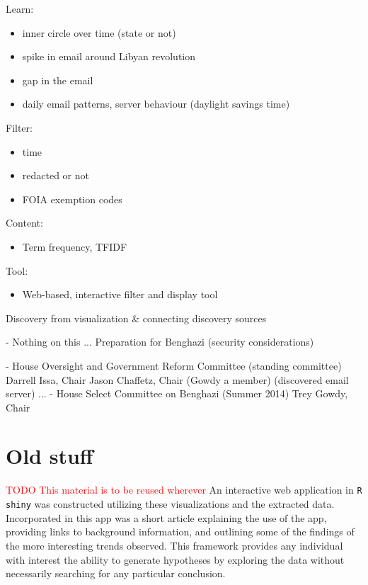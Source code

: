 \documentclass[journal]{vgtc}                %
\newcommand*{\TODO}[1]{\textcolor{red}{TODO #1}}
\begin{document}
Learn:
\begin{itemize}
\item inner circle over time (state or not)
\item spike in email around Libyan revolution
\item gap in the email
\item daily email patterns, server behaviour (daylight savings time)
\end{itemize}

  
 Filter:
\begin{itemize}
\item time
\item redacted or not
\item FOIA exemption codes
\end{itemize}

   
 Content:
\begin{itemize}
\item Term frequency, TFIDF
\end{itemize}

   
 Tool: 
\begin{itemize}
\item Web-based, interactive filter and display tool
\end{itemize}
    
    
Discovery from visualization \& connecting discovery sources



- Nothing on this ... Preparation for Benghazi (security considerations)

- House Oversight and Government Reform Committee (standing committee) 
  Darrell Issa, Chair
     Jason Chaffetz, Chair (Gowdy a member)
  (discovered email server)
    ... 
- House Select Committee on Benghazi (Summer 2014) 
   Trey Gowdy, Chair

\section{Old stuff}
\TODO{This material is to be reused wherever}
An interactive web application in \texttt{R} \texttt{shiny} was constructed utilizing these visualizations and the extracted data. Incorporated in this app was a short article explaining the use of the app, providing links to background information, and outlining some of the findings of the more interesting trends observed. This framework provides any individual with interest the ability to generate hypotheses by exploring the data without necessarily searching for any particular conclusion. 
\end{document}
